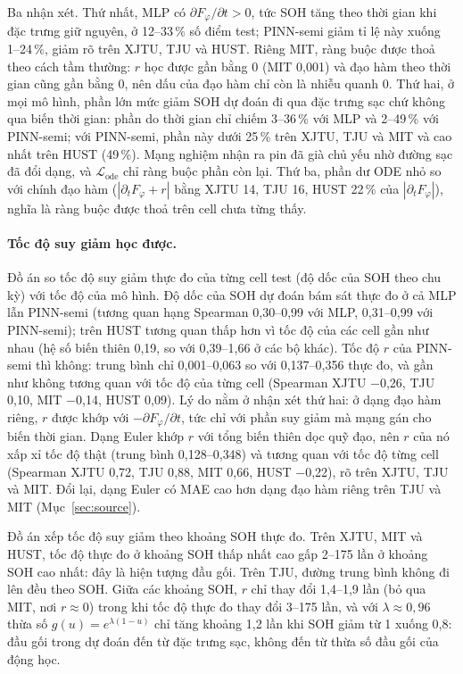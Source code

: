 \documentclass[12pt,a4paper,oneside]{report}
\theoremstyle{plain}
\theoremstyle{definition}
\begin{document}
Ba nhận xét. Thứ nhất, MLP có $\partial F_\varphi/\partial t > 0$, tức SOH tăng theo thời gian khi đặc trưng giữ
nguyên, ở 12--33\,\% số điểm test; PINN-semi giảm tỉ lệ này xuống 1--24\,\%, giảm rõ trên XJTU, TJU và HUST. Riêng MIT, ràng buộc được thoả theo cách tầm thường: $r$ học được gần bằng 0 (MIT 0{,}001) và đạo hàm theo thời gian cũng gần bằng 0, nên dấu của đạo hàm chỉ còn là nhiễu quanh 0. Thứ hai, ở mọi
mô hình, phần lớn mức giảm SOH dự đoán đi qua đặc trưng sạc chứ không qua biến thời gian: phần do thời gian chỉ
chiếm 3--36\,\% với MLP và 2--49\,\% với PINN-semi; với PINN-semi, phần này dưới 25\,\% trên XJTU, TJU và MIT và cao
nhất trên HUST (49\,\%). Mạng nghiệm nhận ra pin đã già chủ yếu nhờ đường sạc đã đổi dạng, và $\mathcal{L}_\text{ode}$ chỉ
ràng buộc phần còn lại. Thứ ba, phần dư ODE nhỏ so với chính đạo hàm
($|\partial_t F_\varphi + r|$ bằng XJTU 14, TJU 16, HUST 22\,\% của $|\partial_t F_\varphi|$), nghĩa là ràng buộc được thoả trên cell chưa từng thấy.

\paragraph{Tốc độ suy giảm học được.} Đồ án so tốc độ suy giảm thực đo của từng cell test (độ
dốc của SOH theo chu kỳ) với tốc độ của mô hình. Độ dốc của SOH dự đoán bám sát thực đo ở cả MLP lẫn PINN-semi
(tương quan hạng Spearman 0{,}30--0{,}99 với MLP, 0{,}31--0{,}99 với PINN-semi); trên HUST tương quan thấp hơn vì tốc độ của các cell gần như nhau (hệ số biến thiên 0{,}19, so với 0{,}39--1{,}66 ở các bộ khác). Tốc độ $r$ của
PINN-semi thì không: trung bình chỉ 0{,}001--0{,}063 so với 0{,}137--0{,}356 thực đo, và gần như không tương quan với tốc độ của từng
cell (Spearman XJTU −0{,}26, TJU 0{,}10, MIT −0{,}14, HUST 0{,}09). Lý do nằm ở nhận xét thứ hai: ở dạng đạo hàm riêng, $r$ được khớp với
$-\partial F_\varphi/\partial t$, tức chỉ với phần suy giảm mà mạng gán cho biến thời gian. Dạng Euler khớp $r$ với
tổng biến thiên dọc quỹ đạo, nên $r$ của nó xấp xỉ tốc độ thật (trung bình 0{,}128--0{,}348) và tương quan với tốc độ từng cell
(Spearman XJTU 0{,}72, TJU 0{,}88, MIT 0{,}66, HUST −0{,}22), rõ trên XJTU, TJU và MIT. Đổi lại, dạng Euler có MAE cao hơn dạng đạo hàm riêng trên TJU và MIT (Mục~\ref{sec:source}).



Đồ án xếp tốc độ suy giảm theo khoảng SOH thực đo. Trên XJTU, MIT và HUST, tốc độ thực đo ở khoảng SOH thấp nhất cao gấp 2--175 lần ở khoảng SOH cao nhất: đây là hiện tượng đầu gối. Trên TJU, đường trung bình không đi lên đều theo SOH. Giữa các khoảng SOH, $r$ chỉ thay đổi
1{,}4--1{,}9 lần (bỏ qua MIT, nơi $r \approx 0$) trong khi tốc độ thực đo thay đổi 3--175 lần, và với $\lambda \approx 0{,}96$ thừa số
$g(u) = e^{\lambda(1-u)}$ chỉ tăng khoảng 1,2 lần khi SOH giảm từ 1 xuống 0,8: đầu gối trong dự đoán đến từ đặc trưng
sạc, không đến từ thừa số đầu gối của động học.
\end{document}
